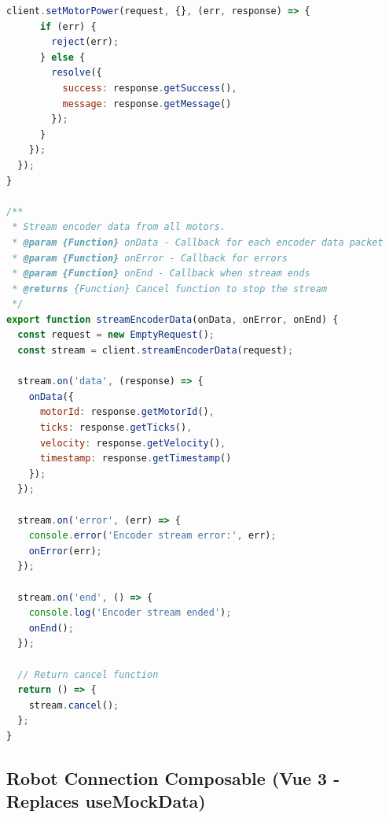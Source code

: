 \begin{lstlisting}[language=JavaScript, caption=src/grpc/client.js]
    client.setMotorPower(request, {}, (err, response) => {
      if (err) {
        reject(err);
      } else {
        resolve({
          success: response.getSuccess(),
          message: response.getMessage()
        });
      }
    });
  });
}

/**
 * Stream encoder data from all motors.
 * @param {Function} onData - Callback for each encoder data packet
 * @param {Function} onError - Callback for errors
 * @param {Function} onEnd - Callback when stream ends
 * @returns {Function} Cancel function to stop the stream
 */
export function streamEncoderData(onData, onError, onEnd) {
  const request = new EmptyRequest();
  const stream = client.streamEncoderData(request);

  stream.on('data', (response) => {
    onData({
      motorId: response.getMotorId(),
      ticks: response.getTicks(),
      velocity: response.getVelocity(),
      timestamp: response.getTimestamp()
    });
  });

  stream.on('error', (err) => {
    console.error('Encoder stream error:', err);
    onError(err);
  });

  stream.on('end', () => {
    console.log('Encoder stream ended');
    onEnd();
  });

  // Return cancel function
  return () => {
    stream.cancel();
  };
}
\end{lstlisting}

\subsection{Robot Connection Composable (Vue 3 - Replaces useMockData)}

